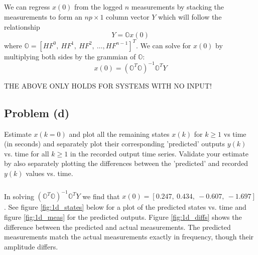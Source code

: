\documentclass[11pt]{article}
\begin{document}
\subparagraph*{}
We can regress $x(0)$ from the logged $n$ measurements by stacking the measurements to form an $np\times1$ column vector $Y$ which will follow the relationship
\begin{equation*}
	Y = \mathbb{O}x(0)
\end{equation*}
where $\mathbb{O}=[HF^0,\ HF^1,\ HF^2,\ \dots, HF^{n-1}]^T$. We can solve for $x(0)$ by multiplying both sides by the grammian of $\mathbb{O}$:
\begin{equation*}
	x(0) = (\mathbb{O}^T\mathbb{O})^{-1}\mathbb{O}^TY
\end{equation*}

THE ABOVE ONLY HOLDS FOR SYSTEMS WITH NO INPUT!

\subsection*{Problem (d)}
Estimate $x(k=0)$ and plot all the remaining states $x(k)$ for $k\geq 1$ vs time (in seconds) and separately plot their corresponding 'predicted' outputs $y(k)$ vs. time for all $k\geq 1$ in the recorded output time series. Validate your estimate by also separately plotting the differences between the 'predicted' and recorded $y(k)$ values vs. time.

\subparagraph*{}
In solving $(\mathbb{O}^T\mathbb{O})^{-1}\mathbb{O}^TY$ we find that $x(0)=[0.247,\ 0.434,\ -0.607,\ -1.697]$. See figure \ref{fig:1d_states} below for a plot of the predicted states vs. time and figure \ref{fig:1d_meas} for the predicted outputs. Figure \ref{fig:1d_diffs} shows the difference between the predicted and actual measurements. The predicted measurements match the actual measurements exactly in frequency, though their amplitude differs.
\end{document}

